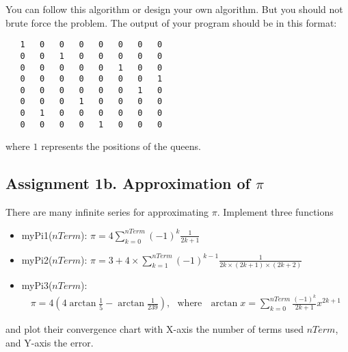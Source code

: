 \documentclass[12pt,a4paper,hidelinks,fleqn]{article}            %
\begin{document}
You can follow this algorithm or design your own algorithm.
But you should not brute force the problem.
The output of your program should be in this format:
\begin{verbatim}
   1   0   0   0   0   0   0   0
   0   0   1   0   0   0   0   0
   0   0   0   0   0   1   0   0
   0   0   0   0   0   0   0   1
   0   0   0   0   0   0   1   0
   0   0   0   1   0   0   0   0
   0   1   0   0   0   0   0   0
   0   0   0   0   1   0   0   0
\end{verbatim}
where $1$ represents the positions of the queens.

\subsection*{Assignment 1b. Approximation of $\pi$}
There are many infinite series for approximating $\pi$.
Implement three functions 
\begin{itemize}
\item myPi1($nTerm$): $\displaystyle \pi = 4 \sum_{k=0}^{nTerm} (-1)^{k}\frac{1}{2k+1}$
\item myPi2($nTerm$): $\displaystyle \pi = 3 + 4 \times \sum_{k=1}^{nTerm}(-1)^{k-1}\frac{1}{2k \times (2k+1) \times (2k+2)}$
\item myPi3($nTerm$): 
\begin{align*}
\pi = 4(4\arctan \frac{1}{5} - \arctan \frac{1}{239}), ~~~\text{where} 
~~~\arctan x = \sum_{k=0}^{nTerm} \frac{(-1)^k} {2k+1} x^{2k+1}
\end{align*}
\end{itemize}
and plot their convergence chart with X-axis the number of terms used $nTerm$, and Y-axis the error.
\end{document}
